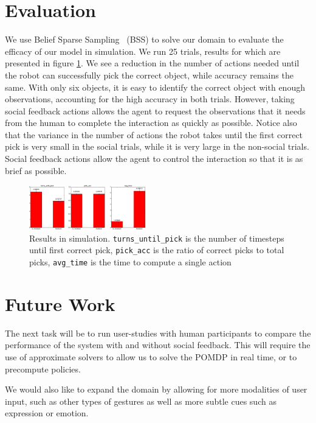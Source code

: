 \documentclass[conference]{IEEEtran}
\begin{document}
\section{Evaluation}

We use Belief Sparse Sampling~\citep{bss} (BSS) to solve our domain to evaluate the efficacy of our model in simulation. We run 25 trials, results for which are presented in figure \ref{fig:toyresults}. We see a reduction in the number of actions needed until the robot can successfully pick the correct object, while accuracy remains the same. With only six objects, it is easy to identify the correct object with enough observations, accounting for the high accuracy in both trials. However, taking social feedback actions allows the agent to request the observations that it needs from the human to complete the interaction as quickly as possible. Notice also that the variance in the number of actions the robot takes until the first correct pick is very small in the social trials, while it is very large in the non-social trials. Social feedback actions allow the agent to control the interaction so that it is as brief as possible. 

\begin{figure}[H]
\begin{center}
	\includegraphics[width=0.45\textwidth]{resources/results}
\end{center}
\caption{Results in simulation. \texttt{turns\_until\_pick} is the number of timesteps until first correct pick,  \texttt{pick\_acc} is the ratio of correct picks to total picks, \texttt{avg\_time} is the time to compute a single action}
	\label{fig:toyresults}
\end{figure}


\section{Future Work}

The next task will be to run user-studies with human participants to compare the performance of the system with and without social feedback. This will require the use of approximate solvers to allow us to solve the POMDP in real time, or to precompute policies. 

We would also like to expand the domain by allowing for more modalities of user input, such as other types of gestures as well as more subtle cues such as expression or emotion. 
\end{document}
